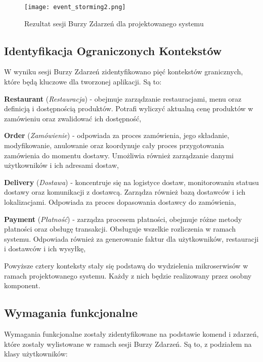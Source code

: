 \clearpage

\begin{figure}[!h]
    \centering \texttt{[image: event\_storming2.png]}
    \caption{Rezultat sesji Burzy Zdarzeń dla projektowanego systemu}
\end{figure}

\subsection{Identyfikacja Ograniczonych Kontekstów}

W wyniku sesji Burzy Zdarzeń zidentyfikowano pięć kontekstów granicznych, które będą kluczowe dla tworzonej aplikacji. Są to:

\textbf{Restaurant} (\textit{Restauracja}) - obejmuje zarządzanie restauracjami, menu oraz definicją i dostępnością produktów. Potrafi wyliczyć aktualną cenę produktów w zamówieniu oraz zwalidować ich dostępność,

\textbf{Order} (\textit{Zamówienie}) - odpowiada za proces zamówienia, jego składanie, modyfikowanie, anulowanie oraz koordynuje cały proces przygotowania zamówienia do momentu dostawy. Umożliwia również zarządzanie danymi użytkowników i ich adresami dostaw,

\textbf{Delivery} (\textit{Dostawa}) - koncentruje się na logistyce dostaw, monitorowaniu statusu dostawy oraz komunikacji z dostawcą. Zarządza również bazą dostawców i ich lokalizacjami. Odpowiada za proces dopasowania dostawcy do zamówienia,

\textbf{Payment} (\textit{Płatność}) - zarządza procesem płatności, obejmuje różne metody płatności oraz obsługę transakcji. Obsługuje wszelkie rozliczenia w ramach systemu. Odpowiada również za generowanie faktur dla użytkowników, restauracji i dostawców i ich wysyłkę,

\medskip

Powyższe cztery konteksty stały się podstawą do wydzielenia mikroserwisów w ramach projektowanego systemu. Każdy z nich będzie realizowany przez osobny komponent.

\subsection{Wymagania funkcjonalne}

Wymagania funkcjonalne zostały zidentyfikowane na podstawie komend i zdarzeń, które zostały wylistowane w ramach sesji Burzy Zdarzeń. Są to, z podziałem na klasy użytkowników:

